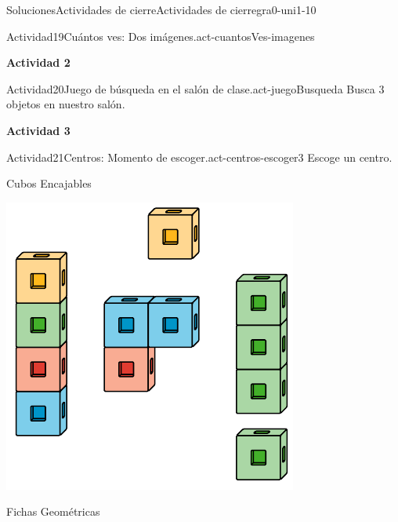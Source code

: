 \documentclass[twoside,10pt,]{article}
\begin{document}
\begin{solutions-section}{Soluciones}{Actividades de cierre}{}{Actividades de cierre}{}{}{gra0-uni1-10}
\begin{activitysolution}{Actividad}{19}{Cuántos ves: Dos imágenes.}{act-cuantosVes-imagenes}
\begin{sidebyside}{2}{0}{0}{0}
\begin{sbspanel}{0.5}
\end{sbspanel}%
\end{sidebyside}%
\end{activitysolution}%
\par\medskip
\noindent\textbf{\large{}\space\textperiodcentered\space{}Actividad 2}
\begin{activitysolution}{Actividad}{20}{Juego de búsqueda en el salón de clase.}{act-juegoBusqueda}%
Busca 3 objetos en nuestro salón.%
\end{activitysolution}%
\par\medskip
\noindent\textbf{\large{}\space\textperiodcentered\space{}Actividad 3}
\begin{activitysolution}{Actividad}{21}{Centros: Momento de escoger.}{act-centros-escoger3}%
Escoge un centro.%
\begin{sidebyside}{2}{0.025}{0.025}{0.05}%
\begin{sbspanel}{0.45}%
Cubos Encajables%
\par
\includegraphics[width=\linewidth]{external/svg-source/tikz-file-128850.pdf}
\end{sbspanel}%
\begin{sbspanel}{0.45}%
Fichas Geométricas%
\par

\end{sbspanel}
\end{sidebyside}
\end{activitysolution}
\end{solutions-section}
\end{document}
